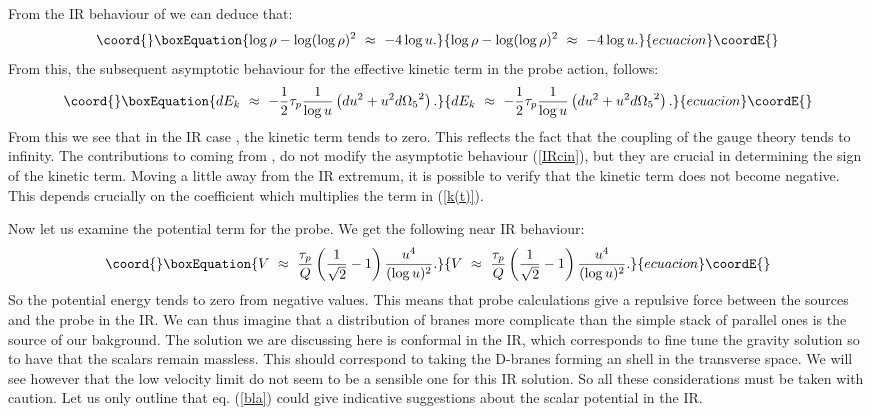 \documentclass[a4paper,12pt]{article}
\def\half{{1 \over 2}}
\begin{document}
From the IR behaviour of \myHighlight{$\eta$}\coordHE{} we can deduce that:
\begin{equation}\coord{}\boxEquation{
\log\rho - \log(\log\rho)^2~\approx ~-4\log u.
}{
\log\rho - \log(\log\rho)^2~\approx ~-4\log u.
}{ecuacion}\coordE{}\end{equation}
From this, the subsequent asymptotic behaviour for the effective kinetic term 
in the probe action, follows:
\begin{equation}\coord{}\boxEquation{
dE_k~\approx~-\half \tau_p {1\over\log u}\left(du^2 + u^2 d{\Omega_5}^2\right).
\label{IRcin}
}{
dE_k~\approx~-\half \tau_p {1\over\log u}\left(du^2 + u^2 d{\Omega_5}^2\right).
}{ecuacion}\coordE{}\end{equation}
From this we see that in the IR case , the kinetic term tends to zero. This
reflects the fact that the coupling of the gauge theory tends to infinity. 
The contributions to \coordHE{} coming from \coordHE{}, do not modify the asymptotic behaviour 
(\ref{IRcin}), but they are crucial in determining the sign of the kinetic term.
Moving a little away from the IR extremum, it is possible to verify that the kinetic term does not become negative. This depends crucially on 
the coefficient \coordHE{} which multiplies the \coordHE{} term 
in \coordHE{} (\ref{k(t)}).

Now let us examine the potential term for the probe. We get the following near IR
behaviour:
\begin{equation}\coord{}\boxEquation{
V~\approx~{\tau_p\over Q}\left({1\over\sqrt2} - 1\right){u^4\over(\log u)^2}.
\label{bla} 
}{
V~\approx~{\tau_p\over Q}\left({1\over\sqrt2} - 1\right){u^4\over(\log u)^2}.
}{ecuacion}\coordE{}\end{equation}
So the potential energy tends to zero from negative values. This means that  
probe calculations give a repulsive force between the sources and the probe in the IR. We can thus imagine that a distribution of branes more complicate than
the simple stack of parallel ones is the source of our bakground. The solution we are discussing here is conformal in the IR, which corresponds to fine tune the gravity solution so to have that the scalars remain massless. This should correspond to taking the D-branes forming an \coordHE{} shell in the transverse space. We will see however that the low velocity limit do not 
seem to be a sensible one for this IR solution. So all these considerations must be
taken with caution. Let us only outline that eq. (\ref{bla}) could give indicative suggestions about the scalar potential in the IR.
\end{document}
